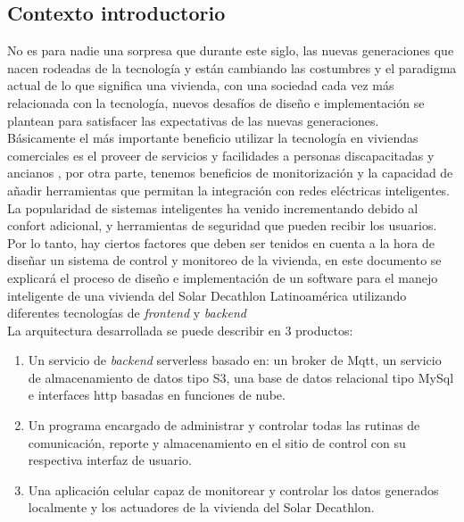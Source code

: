 \subsection{Contexto introductorio}
No es para nadie una sorpresa que durante este siglo, las nuevas generaciones que nacen rodeadas de la tecnología y están cambiando las costumbres y el paradigma actual de lo que significa una vivienda, con una sociedad cada vez más relacionada con la tecnología, nuevos desafíos de diseño e implementación se plantean para satisfacer las expectativas de las nuevas generaciones.
\vspace{0.5cm}\\
Básicamente el más importante beneficio utilizar la tecnología en viviendas comerciales es el proveer de servicios y facilidades a personas discapacitadas y ancianos \cite{GiralSala2016}, por otra parte, tenemos beneficios de monitorización y la capacidad de añadir herramientas que permitan la integración con redes eléctricas inteligentes. La popularidad de sistemas inteligentes ha venido incrementando debido al confort adicional, y herramientas de seguridad que pueden recibir los usuarios. 
\vspace{0.5cm}\\
Por lo tanto, hay ciertos factores que deben ser tenidos en cuenta a la hora de diseñar un sistema de control y monitoreo de la vivienda, en este documento se explicará el proceso de diseño e implementación de un software para el manejo inteligente de una vivienda del Solar Decathlon Latinoamérica utilizando diferentes tecnologías de \textit{frontend} y \textit{backend}
\vspace{0.5cm}\\
La arquitectura desarrollada se puede describir en 3 productos:
 
\begin{enumerate}
	\item Un servicio de \textit{backend} serverless basado en: un broker de Mqtt, un servicio de almacenamiento de datos tipo S3, una base de datos relacional tipo MySql e interfaces http basadas en funciones de nube. 
	\item Un programa encargado de administrar y controlar todas las rutinas de comunicación, reporte y almacenamiento en el sitio de control con su respectiva interfaz de usuario.
	\item Una aplicación celular capaz de monitorear y controlar los datos generados localmente y los actuadores de la vivienda del Solar Decathlon.
\end{enumerate}

